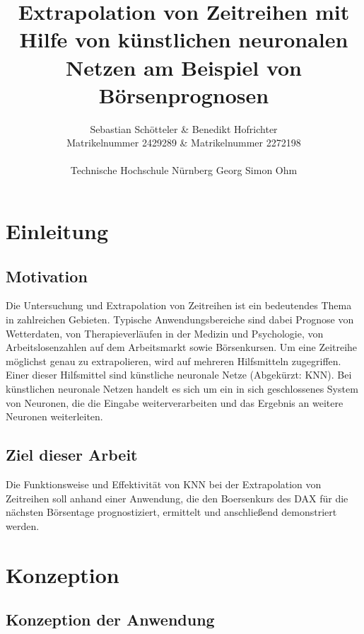 \documentclass[11pt,a4paper]{scrreprt}
\begin{document}
\title
{
 {\bf Extrapolation von Zeitreihen mit Hilfe von künstlichen neuronalen Netzen am Beispiel von Börsenprognosen}
}

\author
{
	Sebastian Schötteler \& Benedikt Hofrichter \\
	Matrikelnummer 2429289 \& Matrikelnummer 2272198 \\\\ 
	Technische Hochschule Nürnberg Georg Simon Ohm \\
}


\maketitle

\tableofcontents


\chapter{Einleitung}
	\section{Motivation}
Die Untersuchung  und Extrapolation von Zeitreihen ist ein bedeutendes Thema in zahlreichen Gebieten. Typische Anwendungsbereiche sind dabei Prognose von Wetterdaten, von Therapieverläufen in der  Medizin und Psychologie, von Arbeitslosenzahlen auf dem Arbeitsmarkt sowie Börsenkursen. Um eine Zeitreihe möglichst genau zu extrapolieren, wird auf mehreren Hilfsmitteln zugegriffen. Einer dieser Hilfsmittel sind künstliche neuronale Netze (Abgekürzt: KNN). Bei künstlichen neuronale Netzen handelt es sich um ein in sich geschlossenes System von Neuronen, die die Eingabe weiterverarbeiten und das Ergebnis an weitere Neuronen weiterleiten.  

	\section{Ziel dieser Arbeit}
Die Funktionsweise und Effektivität von KNN bei der Extrapolation von Zeitreihen soll anhand einer Anwendung, die den Boersenkurs des DAX für die nächsten Börsentage prognostiziert, ermittelt und anschließend demonstriert werden.

\chapter{Konzeption} %
	\section{Konzeption der Anwendung} %
\end{document}
